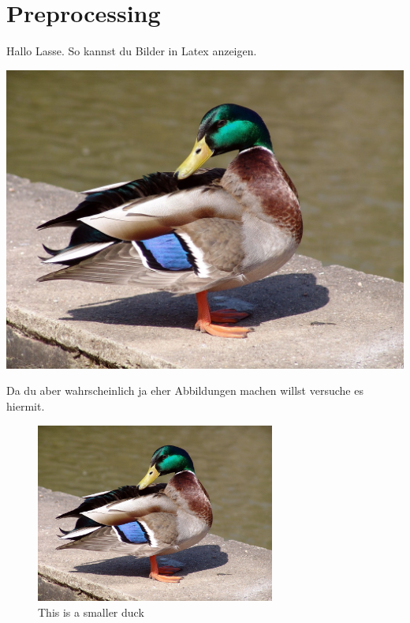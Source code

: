 \section{Preprocessing}


Hallo Lasse. So kannst du Bilder in Latex anzeigen.

\includegraphics[width=\textwidth]{images/duck.jpg}


Da du aber wahrscheinlich ja eher Abbildungen machen willst versuche es hiermit.

\begin{figure}[h]
	\centering
	\includegraphics[width=0.7\textwidth]{images/duck.jpg}
	\caption{This is a smaller duck}
	\label{fig:duck}
\end{figure}